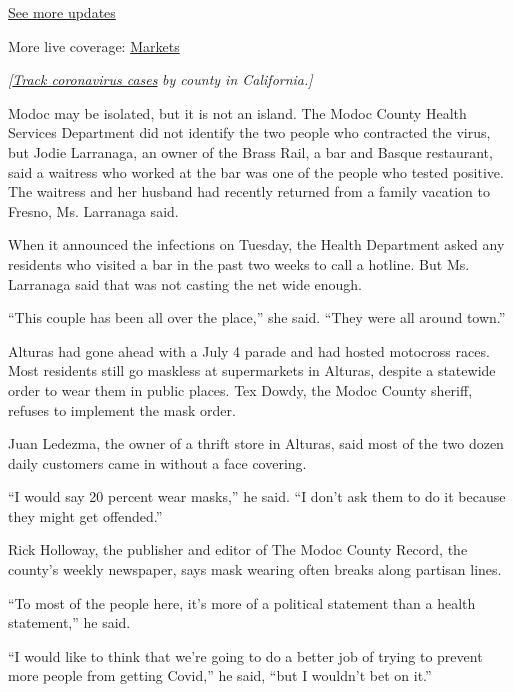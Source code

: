 \href{https://www.nytimes3xbfgragh.onion/2020/08/03/world/coronavirus-covid-19.html?action=click\&pgtype=Article\&state=default\&region=MAIN_CONTENT_1\&context=storylines_live_updates}{See
more updates}

More live coverage:
\href{https://www.nytimes3xbfgragh.onion/live/2020/08/03/business/stock-market-today-coronavirus?action=click\&pgtype=Article\&state=default\&region=MAIN_CONTENT_1\&context=storylines_live_updates}{Markets}

\emph{{[}}\href{https://www.nytimes3xbfgragh.onion/interactive/2020/us/california-coronavirus-cases.html}{\emph{Track
coronavirus cases}} \emph{by county in California.{]}}

Modoc may be isolated, but it is not an island. The Modoc County Health
Services Department did not identify the two people who contracted the
virus, but Jodie Larranaga, an owner of the Brass Rail, a bar and Basque
restaurant, said a waitress who worked at the bar was one of the people
who tested positive. The waitress and her husband had recently returned
from a family vacation to Fresno, Ms. Larranaga said.

When it announced the infections on Tuesday, the Health Department asked
any residents who visited a bar in the past two weeks to call a hotline.
But Ms. Larranaga said that was not casting the net wide enough.

``This couple has been all over the place,'' she said. ``They were all
around town.''

Alturas had gone ahead with a July 4 parade and had hosted motocross
races. Most residents still go maskless at supermarkets in Alturas,
despite a statewide order to wear them in public places. Tex Dowdy, the
Modoc County sheriff, refuses to implement the mask order.

Juan Ledezma, the owner of a thrift store in Alturas, said most of the
two dozen daily customers came in without a face covering.

``I would say 20 percent wear masks,'' he said. ``I don't ask them to do
it because they might get offended.''

Rick Holloway, the publisher and editor of The Modoc County Record, the
county's weekly newspaper, says mask wearing often breaks along partisan
lines.

``To most of the people here, it's more of a political statement than a
health statement,'' he said.

``I would like to think that we're going to do a better job of trying to
prevent more people from getting Covid,'' he said, ``but I wouldn't bet
on it.''

